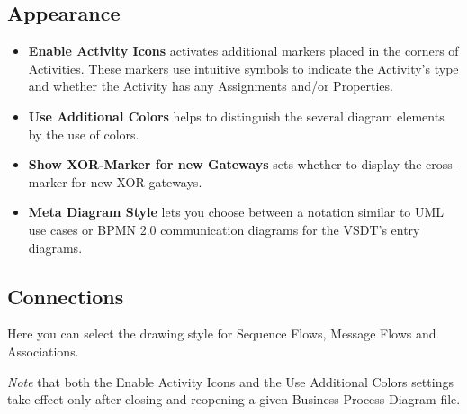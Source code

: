 \subsection{Appearance}
\begin{itemize}
	\item \textbf{Enable Activity Icons} activates additional markers placed in
	the corners of Activities.  These markers use intuitive symbols to indicate
	the Activity's type and whether the Activity has any Assignments and/or
	Properties.
	
	\item \textbf{Use Additional Colors} helps to distinguish the several diagram
	elements by the use of colors.
	
	\item \textbf{Show XOR-Marker for new Gateways} sets whether to display the
	cross-marker for new XOR gateways.
	
	\item \textbf{Meta Diagram Style} lets you choose between a notation similar
	to UML use cases or BPMN 2.0 communication diagrams for the VSDT's entry
	diagrams.
\end{itemize}


\subsection{Connections}
Here you can select the drawing style for Sequence Flows, Message Flows and
Associations.

\emph{Note} that both the Enable Activity Icons and the Use Additional Colors
settings take effect only after closing and reopening a given Business Process
Diagram file.

